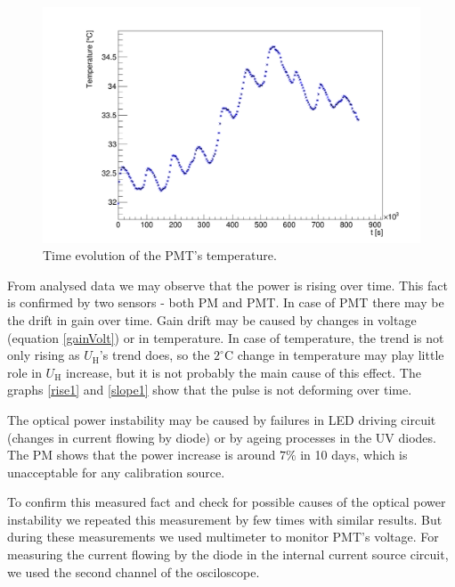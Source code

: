 \begin{figure}[H]
 \centering
 \includegraphics[scale=0.3]{./pictures/temperatures}
 \caption{Time evolution of the PMT's temperature.}
 \label{temp1}
\end{figure}

From analysed data we may observe that the power is rising over time. This fact is confirmed by two sensors - both PM and PMT. In case of PMT there may be the drift in gain over time. Gain drift may be caused by changes in voltage (equation \ref{gainVolt}) or in temperature. In case of temperature, the trend is not only rising as $U_\textrm{H}$'s trend does, so the $2^{\circ}$C change in temperature may play little role in $U_\textrm{H}$ increase, but it is not probably the main cause of this effect.
The graphs \ref{rise1} and \ref{slope1} show that the pulse is not deforming over time.
\par
The optical power instability may be caused by failures in LED driving circuit (changes in current flowing by diode) or by ageing processes in the UV diodes. The PM shows that the power increase is around $7 \%$ in 10 days, which is unacceptable for any calibration source. 
\par
To confirm this measured fact and check for possible causes of the optical power instability we repeated this measurement by few times with similar results. But during these measurements we used multimeter to monitor PMT's voltage. For measuring the current flowing by the diode in the internal current source circuit, we used the second channel of the osciloscope.

